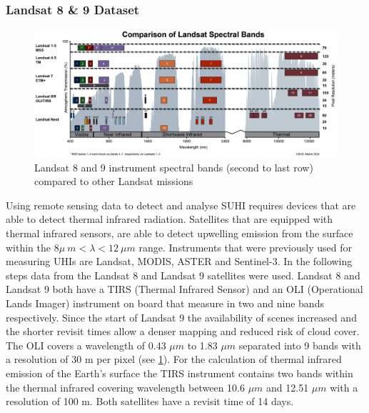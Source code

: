 \documentclass[12pt,a4paper, english,twoside]{scrartcl}
\begin{document}
    \subsubsection{Landsat 8 \& 9 Dataset}\label{sec:landsat}
      \begin{figure}[htbp]
       \begin{center}
         \includegraphics[width=\textwidth]{img/LandsatSpectralBands.png}
       \end{center}
       \caption{Landsat 8 and 9 instrument spectral bands (second to last row) compared to other Landsat missions\autocite{USGSWebsite}\label{fig:lsspectral}}
      \end{figure}
      \noindent
      Using remote sensing data to detect and analyse \gls{SUHI} requires devices that are able to detect thermal infrared radiation. 
      Satellites that are equipped with thermal infrared sensors, are able to detect upwelling emission from the surface within the $ 8\mu\ m < \lambda < 12\ \mu m $ range. 
      Instruments that were previously used for measuring \glspl{UHI} are Landsat, MODIS, ASTER and Sentinel-3. 
      In the following steps data from the Landsat 8 and Landsat 9 satellites were used. 
      Landsat 8 and Landsat 9 both have a TIRS (Thermal Infrared Sensor) and an OLI (Operational Lands Imager) instrument on board that measure in two and nine bands respectively.
      Since the start of Landsat 9 the availability of scenes increased and the shorter revisit times allow a denser mapping and reduced risk of cloud cover. \\ 
      The OLI covers a wavelength of 0.43 $\mu m$ to 1.83 $\mu m$ separated into 9 bands with a resolution of 30 m per pixel (see \cref{fig:lsspectral}). 
      For the calculation of thermal infrared emission of the Earth's surface the TIRS instrument contains two bands within the thermal infrared covering wavelength between 10.6 $\mu m$ and 12.51 $\mu m$ with a resolution of 100 m.
      Both satellites have a revisit time of 14 days. 
\end{document}

